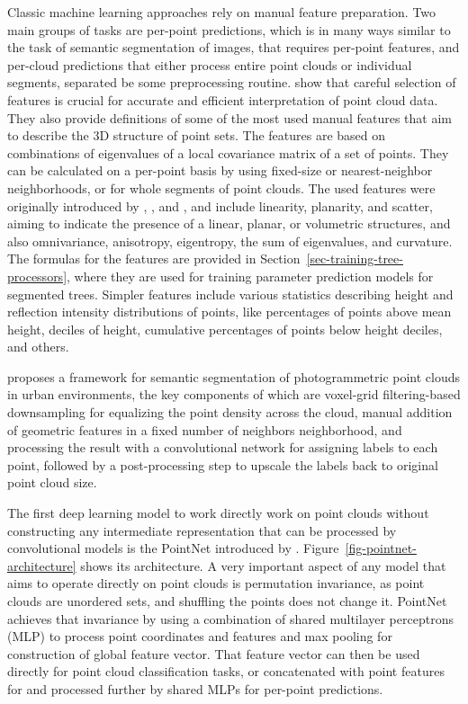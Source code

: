 Classic machine learning approaches rely on manual feature preparation.
Two main groups of tasks are per-point predictions, which is in many ways similar to the task of semantic segmentation of images, that requires per-point features, and per-cloud predictions that either process entire point clouds or individual segments, separated be some preprocessing routine.
\citet{weinmannFeatureRelevanceAssessment2013} show that careful selection of features is crucial for accurate and efficient interpretation of point cloud data.
They also provide definitions of some of the most used manual features that aim to describe the 3D structure of point sets.
The features are based on combinations of eigenvalues of a local covariance matrix of a set of points.
They can be calculated on a per-point basis by using fixed-size or nearest-neighbor neighborhoods, or for whole segments of point clouds.
The used features were originally introduced by \citet{westContextdrivenAutomatedTarget2004}, \citet{paulyEfficientSimplificationPointsampled2002}, and \citet{malletRelevanceAssessmentFullwaveform2011}, and include linearity, planarity, and scatter, aiming to indicate the presence of a linear, planar, or volumetric structures, and also omnivariance, anisotropy, eigentropy, the sum of eigenvalues, and curvature.
The formulas for the features are provided in Section~\ref{sec-training-tree-processors}, where they are used for training parameter prediction models for segmented trees.
Simpler features include various statistics describing height and reflection intensity distributions of points, like percentages of points above mean height, deciles of height, cumulative percentages of points below height deciles, and others.

\citet{ozdemirDeepLearningFramework2021} proposes a framework for semantic segmentation of photogrammetric point clouds in urban environments, the key components of which are voxel-grid filtering-based downsampling for equalizing the point density across the cloud, manual addition of geometric features in a fixed number of neighbors neighborhood, and processing the result with a convolutional network for assigning labels to each point, followed by a post-processing step to upscale the labels back to original point cloud size.

The first deep learning model to work directly work on point clouds without constructing any intermediate representation that can be processed by convolutional models is the PointNet introduced by \citet{qiPointNet2017}.
Figure~\ref{fig-pointnet-architecture} shows its architecture.
A very important aspect of any model that aims to operate directly on point clouds is permutation invariance, as point clouds are unordered sets, and shuffling the points does not change it.
PointNet achieves that invariance by using a combination of shared multilayer perceptrons (MLP) to process point coordinates and features and max pooling for construction of global feature vector.
That feature vector can then be used directly for point cloud classification tasks, or concatenated with point features for and processed further by shared MLPs for per-point predictions.

